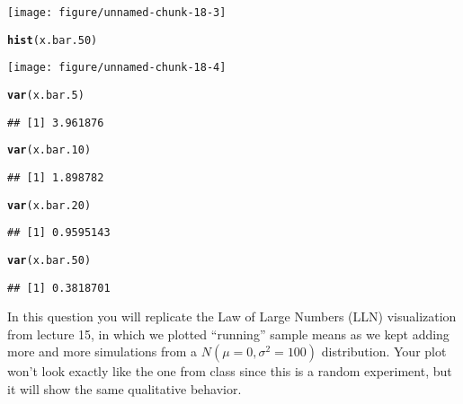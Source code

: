 \documentclass[addpoints,12pt]{exam}\usepackage[]{graphicx}\usepackage[]{color}
\makeatletter
\def\maxwidth{ %
  \ifdim\Gin@nat@width>\linewidth
    \linewidth
  \else
    \Gin@nat@width
  \fi
}
\newcommand{\hlstd}[1]{\textcolor[rgb]{0.345,0.345,0.345}{#1}}%
\newcommand{\hlkwd}[1]{\textcolor[rgb]{0.737,0.353,0.396}{\textbf{#1}}}%
\newenvironment{kframe}{%
 \def\at@end@of@kframe{}%
 \ifinner\ifhmode%
  \def\at@end@of@kframe{\end{minipage}}%
  \begin{minipage}{\columnwidth}%
 \fi\fi%
 \def\FrameCommand##1{\hskip\@totalleftmargin \hskip-\fboxsep
 \colorbox{shadecolor}{##1}\hskip-\fboxsep
     \hskip-\linewidth \hskip-\@totalleftmargin \hskip\columnwidth}%
 \MakeFramed {\advance\hsize-\width
   \@totalleftmargin\z@ \linewidth\hsize
   \@setminipage}}%
 {\par\unskip\endMakeFramed%
 \at@end@of@kframe}
\newenvironment{knitrout}{}{} %
\makeatother
\begin{document}
\begin{questions}
\begin{parts}
\begin{solution}
\begin{knitrout}
{\centering \texttt{[image: figure/unnamed-chunk-18-3]} 

}


\begin{kframe}\begin{alltt}
\hlkwd{hist}\hlstd{(x.bar.50)}
\end{alltt}
\end{kframe}

{\centering \texttt{[image: figure/unnamed-chunk-18-4]} 

}


\begin{kframe}\begin{alltt}
\hlkwd{var}\hlstd{(x.bar.5)}
\end{alltt}
\begin{verbatim}
## [1] 3.961876
\end{verbatim}
\begin{alltt}
\hlkwd{var}\hlstd{(x.bar.10)}
\end{alltt}
\begin{verbatim}
## [1] 1.898782
\end{verbatim}
\begin{alltt}
\hlkwd{var}\hlstd{(x.bar.20)}
\end{alltt}
\begin{verbatim}
## [1] 0.9595143
\end{verbatim}
\begin{alltt}
\hlkwd{var}\hlstd{(x.bar.50)}
\end{alltt}
\begin{verbatim}
## [1] 0.3818701
\end{verbatim}
\end{kframe}
\end{knitrout}
\end{solution}
	\end{parts}
\question In this question you will replicate the Law of Large Numbers (LLN) visualization from lecture 15, in which we plotted ``running'' sample means as we kept adding more and more simulations from a $N(\mu = 0, \sigma^2 = 100)$ distribution. Your plot won't look exactly like the one from class since this is a random experiment, but it will show the same qualitative behavior.
    \begin{parts}

\end{parts}
\end{questions}
\end{document}
